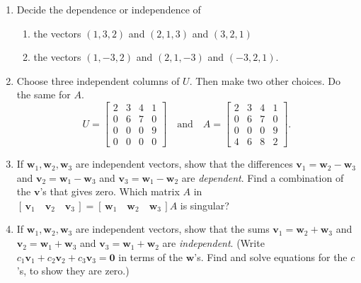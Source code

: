 \documentclass[14pt, a4paper]{article}
\begin{document}
\begin{enumerate}
    \item Decide the dependence or independence of
          \begin{enumerate}
              \item the vectors $(1, 3, 2)$ and $(2, 1, 3)$ and $(3, 2, 1)$
              \item the vectors $(1, -3, 2)$ and $(2, 1, -3)$ and $(-3, 2, 1)$.
          \end{enumerate}

    \item Choose three independent columns of $U$. Then make two other choices. Do the same for $A$.
          \[
              U = \begin{bmatrix} 2 & 3 & 4 & 1 \\ 0 & 6 & 7 & 0 \\ 0 & 0 & 0 & 9 \\ 0 & 0 & 0 & 0 \end{bmatrix}
              \quad \text{and} \quad
              A = \begin{bmatrix} 2 & 3 & 4 & 1 \\ 0 & 6 & 7 & 0 \\ 0 & 0 & 0 & 9 \\ 4 & 6 & 8 & 2 \end{bmatrix}.
          \]

    \item If $\boldsymbol{w}_1, \boldsymbol{w}_2, \boldsymbol{w}_3$ are independent vectors, show that the differences $\boldsymbol{v}_1 = \boldsymbol{w}_2 - \boldsymbol{w}_3$ and $\boldsymbol{v}_2 = \boldsymbol{w}_1 - \boldsymbol{w}_3$ and $\boldsymbol{v}_3 = \boldsymbol{w}_1 - \boldsymbol{w}_2$ are \emph{dependent}. Find a combination of the $\boldsymbol{v}$'s that gives zero. Which matrix $A$ in $[\, \boldsymbol{v}_1 \quad \boldsymbol{v}_2 \quad \boldsymbol{v}_3 \,] = [\, \boldsymbol{w}_1 \quad \boldsymbol{w}_2 \quad \boldsymbol{w}_3 \,] A$ is singular?

    \item If $\boldsymbol{w}_1, \boldsymbol{w}_2, \boldsymbol{w}_3$ are independent vectors, show that the sums $\boldsymbol{v}_1 = \boldsymbol{w}_2 + \boldsymbol{w}_3$ and $\boldsymbol{v}_2 = \boldsymbol{w}_1 + \boldsymbol{w}_3$ and $\boldsymbol{v}_3 = \boldsymbol{w}_1 + \boldsymbol{w}_2$ are \emph{independent}. (Write $c_1\boldsymbol{v}_1 + c_2\boldsymbol{v}_2 + c_3\boldsymbol{v}_3 = \boldsymbol{0}$ in terms of the $\boldsymbol{w}$'s. Find and solve equations for the $c$'s, to show they are zero.)


\end{enumerate}
\end{document}
